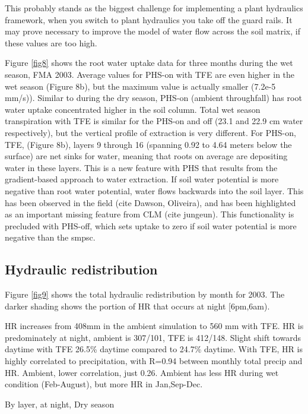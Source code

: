 \documentclass[draft,linenumbers]{agujournal}
\begin{document}
This probably stands as the biggest challenge for implementing a plant hydraulics framework, 
when you switch to plant hydraulics you take off the guard rails. 
It may prove necessary to improve the model of water flow across the soil matrix, if these values are too high.

Figure \ref{fig8} shows the root water uptake data for three months during the wet season, FMA 2003. 
Average values for PHS-on with TFE are even higher in the wet season (Figure 8b), but the maximum value is actually smaller (7.2e-5 mm/s)).
Similar to during the dry season, PHS-on (ambient throughfall) has root water uptake concentrated higher in the soil column.
Total wet season transpiration with TFE is similar for the PHS-on and off (23.1 and 22.9 cm water respectively), 
but the vertical profile of extraction is very different.
For PHS-on, TFE, (Figure 8b), layers 9 through 16 (spanning 0.92 to 4.64 meters below the surface) are net sinks for water,
meaning that roots on average are depositing water in these layers.
This is a new feature with PHS that results from the gradient-based approach to water extraction. 
If soil water potential is more negative than root water potential, water flows backwards into the soil layer.
This has been observed in the field (cite Dawson, Oliveira), and has been highlighted as an important missing feature from CLM (cite jungeun).
This functionality is precluded with PHS-off, which sets uptake to zero if soil water potential is more negative than the smpsc. 



\subsection{Hydraulic redistribution}

Figure \ref{fig9} shows the total hydraulic redistribution by month for 2003.
The darker shading shows the portion of HR that occurs at night [6pm,6am). 

HR increases from 408mm in the ambient simulation to 560 mm with TFE.
HR is predominately at night, ambient is 307/101, TFE is 412/148. 
Slight shift towards daytime with TFE 26.5\% daytime compared to 24.7\% daytime.
With TFE, HR is highly correlated to precipitation, with R=0.94 between monthly total precip and HR.
Ambient, lower correlation, just 0.26. 
Ambient has less HR during wet condition (Feb-August), but more HR in Jan,Sep-Dec.

By layer, at night, Dry season
\end{document}
